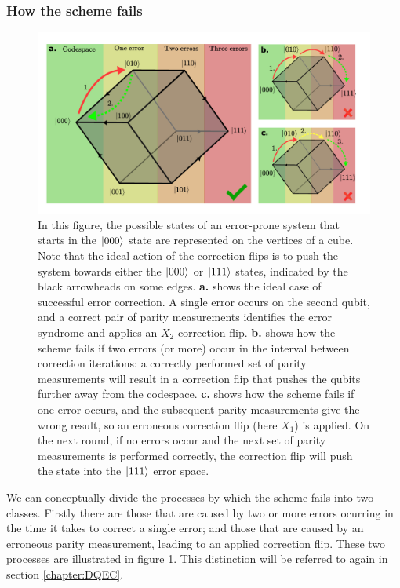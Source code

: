 \documentclass{report}
\begin{document}
\subsubsection{How the scheme fails}
\begin{figure}[ht]
    \centering
    \includegraphics[scale = 0.85]{Figures/cubediagram.pdf}
    \caption{In this figure, the possible states of an error-prone system that starts in the $\ket{000}$ state are represented on the vertices of a cube. Note that the ideal action of the correction flips is to push the system towards either the $\ket{000}$ or $\ket{111}$ states, indicated by the black arrowheads on some edges. \textbf{a.} shows the ideal case of successful error correction. A single error occurs on the second qubit, and a correct pair of parity measurements identifies the error syndrome and applies an $X_2$ correction flip. \textbf{b.} shows how the scheme fails if two errors (or more) occur in the interval between correction iterations: a correctly performed set of parity measurements will result in a correction flip that pushes the qubits further away from the codespace. \textbf{c.} shows how the scheme fails if one error occurs, and the subsequent parity measurements give the wrong result, so an erroneous correction flip (here $X_1$) is applied. On the next round, if no errors occur and the next set of parity measurements is performed correctly, the correction flip will push the state into the $\ket{111}$ error space.}
    \label{fig:cubediagram}
\end{figure}
We can conceptually divide the processes by which the scheme fails into two classes. Firstly there are those that are caused by two or more errors ocurring in the time it takes to correct a single error; and those that are caused by an erroneous parity measurement, leading to an applied correction flip. These two processes are illustrated in figure \ref{fig:cubediagram}. This distinction will be referred to again in section \ref{chapter:DQEC}.
\end{document}
